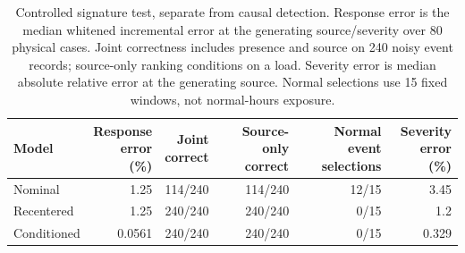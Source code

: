 \begin{table}[t]\centering\small
\caption{Controlled signature test, separate from causal detection. Response error is the median whitened incremental error at the generating source/severity over 80 physical cases. Joint correctness includes presence and source on 240 noisy event records; source-only ranking conditions on a load. Severity error is median absolute relative error at the generating source. Normal selections use 15 fixed windows, not normal-hours exposure.}
\label{tab:ei-results}
\begin{tabular}{lrrrrr}\toprule
Model & \shortstack{Response\\error (\%)} & \shortstack{Joint\\correct} & \shortstack{Source-only\\correct} & \shortstack{Normal event\\selections} & \shortstack{Severity\\error (\%)}\\\midrule
Nominal & 1.25 & 114/240 & 114/240 & 12/15 & 3.45\\
Recentered & 1.25 & 240/240 & 240/240 & 0/15 & 1.2\\
Conditioned & 0.0561 & 240/240 & 240/240 & 0/15 & 0.329\\
\bottomrule\end{tabular}\end{table}
